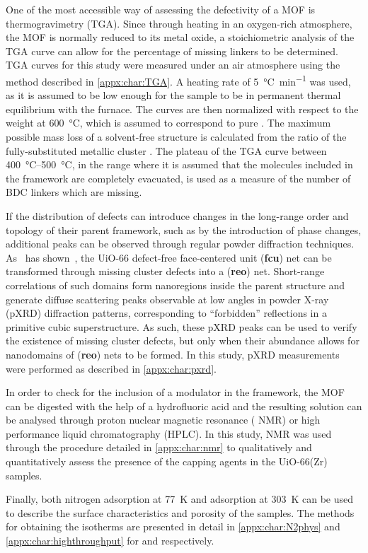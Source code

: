 One of the most accessible way of assessing the defectivity of
a MOF is thermogravimetry (TGA). Since through heating in
an oxygen-rich atmosphere, the MOF is normally reduced to
its metal oxide, a stoichiometric analysis of the TGA curve
can allow for the percentage of missing linkers to be
determined. TGA curves for this study were measured under
an air atmosphere using the method described in \autoref{appx:char:TGA}.
A heating rate of \SI{5}{\degreeCelsius\per\minute} was used,
as it is assumed to be low enough for the sample to be in
permanent thermal equilibrium with the furnace.
The curves are then normalized with respect to the weight at
\SI{600}{\degreeCelsius}, which is assumed to correspond to pure
. The maximum possible mass loss of a solvent-free
structure is calculated from the ratio of the fully-substituted
metallic cluster . The plateau
of the TGA curve between \SIrange{400}{500}{\degreeCelsius},
in the range where it is assumed that the molecules included in
the framework are completely evacuated, is used as a measure of the
number of BDC linkers which are missing.

If the distribution of defects can introduce changes in the
long-range order and topology of their parent framework,
such as by the introduction of phase changes,
additional peaks can be observed through regular
powder diffraction techniques.
As~\citeauthor{cliffeCorrelatedDefectNanoregions2014} has
shown~\cite{cliffeCorrelatedDefectNanoregions2014},
the UiO-66 defect-free face-centered unit (\textbf{fcu})
net can be transformed through missing cluster defects into
a (\textbf{reo}) net. Short-range correlations of such domains
form nanoregions inside the parent structure and generate
diffuse scattering peaks observable at low angles in
powder X-ray (pXRD) diffraction patterns, corresponding to ``forbidden''
reflections in a primitive cubic superstructure.
As such, these pXRD peaks can be used to verify the existence of
missing cluster defects, but only when their abundance allows for
nanodomains of (\textbf{reo}) nets to be formed. In this study,
pXRD measurements were performed as described in \autoref{appx:char:pxrd}.

In order to check for the inclusion of a modulator in the framework,
the MOF can be digested with the help of a hydrofluoric acid and the
resulting solution can be analysed through proton nuclear magnetic 
resonance ( NMR) or high performance liquid chromatography
(HPLC). In this study,  NMR was used through the procedure detailed
in \autoref{appx:char:nmr} to qualitatively and quantitatively assess
the presence of the capping agents in the UiO-66(Zr) samples. 

Finally, both nitrogen adsorption at \SI{77}{\kelvin} and  
adsorption at \SI{303}{\kelvin} can be used to describe the surface 
characteristics and porosity of the samples. The methods for obtaining
the isotherms are presented in detail in \autoref{appx:char:N2phys}
and \autoref{appx:char:highthroughput} for  and 
respectively.
